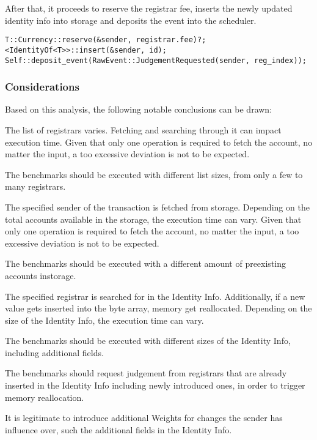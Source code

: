 \documentclass[11pt,a4paper]{article}
\newcommand{\SubItem}[1]{
    {\setlength\itemindent{15pt} \item[-] #1}
}
\begin{document}
After that, it proceeds to reserve the registrar fee, inserts the newly updated identity info into storage
and deposits the event into the scheduler.

\begin{verbatim}
T::Currency::reserve(&sender, registrar.fee)?;
<IdentityOf<T>>::insert(&sender, id);
Self::deposit_event(RawEvent::JudgementRequested(sender, reg_index));
\end{verbatim}

\subsubsection*{Considerations}

Based on this analysis, the following notable conclusions can be drawn:

\begin{itemize}
  \item The list of registrars varies. Fetching and searching through it can impact execution time.
  Given that only one operation is required to fetch the account, no matter the input, a too excessive
  deviation is not to be expected.
  \SubItem{The benchmarks should be executed with different list sizes, from only a few to many
  \newline registrars.}
  \item The specified sender of the transaction is fetched from storage. Depending on the total accounts
  available in the storage, the execution time can vary. Given that only one operation is required to fetch
  the account, no matter the input, a too excessive deviation is not to be expected.
  \SubItem{The benchmarks should be executed with a different amount of preexisting accounts in\newline storage.}
  \item The specified registrar is searched for in the Identity Info. Additionally, if a new value gets
  inserted into the byte array, memory get reallocated. Depending on the size of the Identity Info, the
  execution time can vary.
  \SubItem{The benchmarks should be executed with different sizes of the Identity Info, including
  additional fields.}
  \SubItem{The benchmarks should request judgement from registrars that are already inserted in the Identity
  Info including newly introduced ones, in order to trigger memory reallocation.}
  \SubItem{It is legitimate to introduce additional Weights for changes the sender has influence over,
  such the additional fields in the Identity Info.}
\end{itemize}
\newpage
\end{document}
